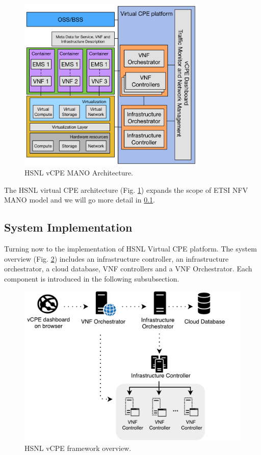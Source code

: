 \begin{figure}[!t]
\centering
\includegraphics[width=0.8\textwidth]{./fig/hsnl_vcpe_architecture}
\caption{HSNL vCPE MANO Architecture.}
\label{fig:hsnl_vcpe_architecture}
\end{figure}

The HSNL virtual CPE architecture (Fig. \ref{fig:hsnl_vcpe_architecture}) expands the scope of ETSI NFV MANO model and we will go more detail in \ref{ssec:hsnl_system_imple}.


\subsection{System Implementation} \label{ssec:hsnl_system_imple}
Turning now to the implementation of HSNL Virtual CPE platform.  The system overview (Fig. \ref{fig:hsnl_vcpe_framework}) includes an infrastructure controller, an infrastructure orchestrator, a cloud database, VNF controllers and a VNF Orchestrator. Each component is introduced in the following subsubsection.

\begin{figure}[!t]
\centering
\includegraphics[width=\textwidth]{./fig/hsnl_vcpe_framework}
\caption{HSNL vCPE framework overview.}
\label{fig:hsnl_vcpe_framework}
\end{figure}

